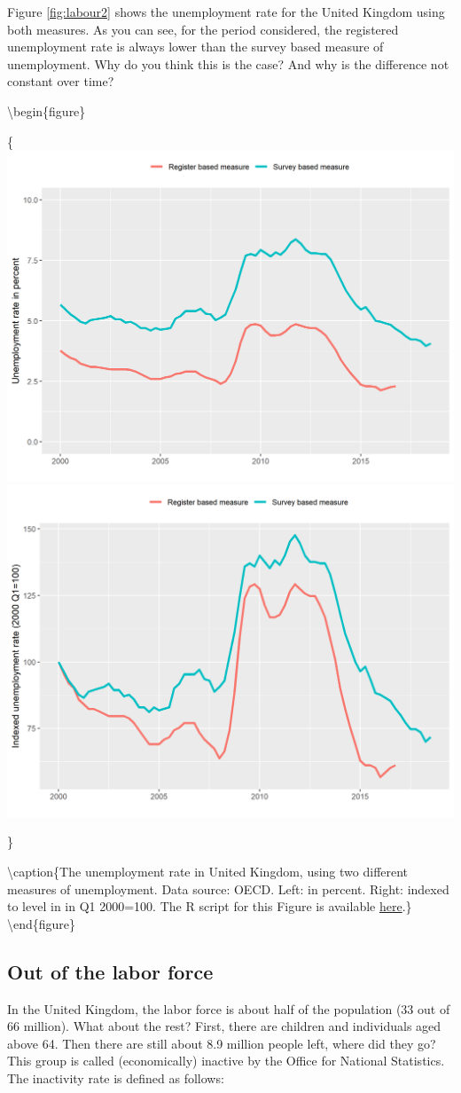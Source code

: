 \documentclass[]{book}
\begin{document}
Figure \ref{fig:labour2} shows the unemployment rate for the United Kingdom using both measures. As you can see, for the period considered, the registered unemployment rate is always lower than the survey based measure of unemployment. Why do you think this is the case? And why is the difference not constant over time?

\textbackslash begin\{figure\}

\{\centering \includegraphics[width=0.49\linewidth]{_resources/chapter_labour/fig14} \includegraphics[width=0.49\linewidth]{_resources/chapter_labour/fig15}

\}

\textbackslash caption\{The unemployment rate in United Kingdom, using two different measures of unemployment. Data source: OECD. Left: in percent. Right: indexed to level in in Q1 2000=100. The R script for this Figure is available \href{https://www.hhsievertsen.net/economicdata/notes/lecture12/rmaterial/lecnote_12_script_for_fig8.R}{here}.\}\label{fig:labour2}
\textbackslash end\{figure\}

\hypertarget{out-of-the-labor-force}{%
\subsection{Out of the labor force}\label{out-of-the-labor-force}}

In the United Kingdom, the labor force is about half of the population (33 out of 66 million). What about the rest? First, there are children and individuals aged above 64. Then there are still about 8.9 million people left, where did they go? This group is called (economically) inactive by the Office for National Statistics. The inactivity rate is defined as follows:
\end{document}
